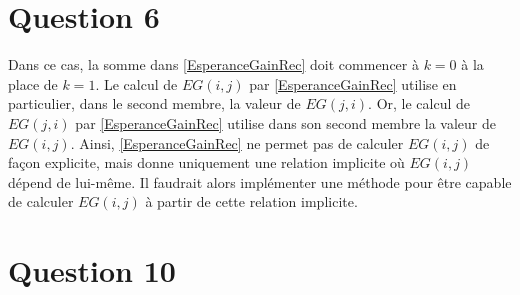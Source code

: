\documentclass[a4paper,11pt]{amsart}
\theoremstyle{plain}
\begin{document}
\section{Question 6}

Dans ce cas, la somme dans \eqref{EsperanceGainRec} doit commencer à $k = 0$ à la place de $k = 1$. Le calcul de $EG(i, j)$ par \eqref{EsperanceGainRec} utilise en particulier, dans le second membre, la valeur de $EG(j, i)$. Or, le calcul de $EG(j, i)$ par \eqref{EsperanceGainRec} utilise dans son second membre la valeur de $EG(i, j)$. Ainsi, \eqref{EsperanceGainRec} ne permet pas de calculer $EG(i, j)$ de façon explicite, mais donne uniquement une relation implicite où $EG(i, j)$ dépend de lui-même. Il faudrait alors implémenter une méthode pour être capable de calculer $EG(i, j)$ à partir de cette relation implicite.

\section{Question 10}
\end{document}

